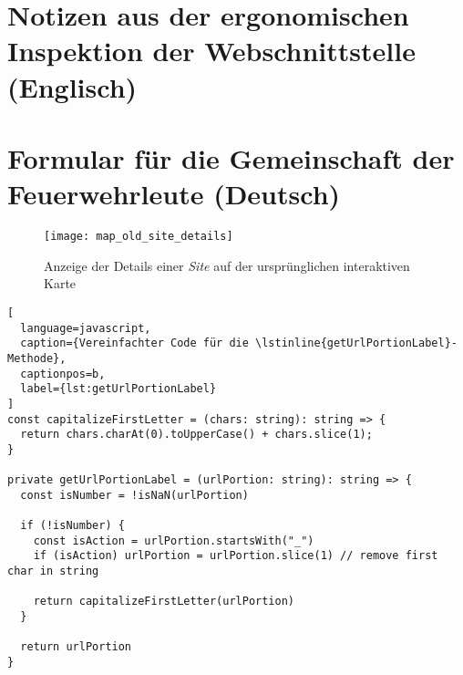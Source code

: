



\section{Notizen aus der ergonomischen Inspektion der Webschnittstelle (Englisch)} \label{appendix:ergonomic-inspection}



\section{Formular für die Gemeinschaft der Feuerwehrleute (Deutsch)} \label{appendix:firefighter-survey}







\begin{figure}[H]
  \centering
  \texttt{[image: map\_old\_site\_details]}
  \caption{Anzeige der Details einer \textit{Site} auf der ursprünglichen interaktiven Karte}
  \label{fig:map_old_site_details}
\end{figure}



\begin{lstlisting}[
  language=javascript,
  caption={Vereinfachter Code für die \lstinline{getUrlPortionLabel}-Methode},
  captionpos=b,
  label={lst:getUrlPortionLabel}
]
const capitalizeFirstLetter = (chars: string): string => {
  return chars.charAt(0).toUpperCase() + chars.slice(1);
}

private getUrlPortionLabel = (urlPortion: string): string => {
  const isNumber = !isNaN(urlPortion)

  if (!isNumber) {
    const isAction = urlPortion.startsWith("_")
    if (isAction) urlPortion = urlPortion.slice(1) // remove first char in string

    return capitalizeFirstLetter(urlPortion)
  }

  return urlPortion
}
\end{lstlisting}

